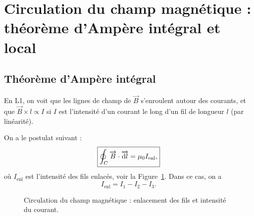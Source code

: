 \section[Circulation du champ magnétique]{Circulation du champ magnétique : théorème d'Ampère intégral et local}

    \subsection{Théorème d'Ampère intégral}

        En L1, on voit que les lignes de champ de $\vec{B}$ s'enroulent autour des courants, et que $\vec{B}\times l\propto I$ si $I$ est l'intensité d'un courant le long d'un fil de longueur $l$ (par linéarité).

        On a le postulat suivant :
        \begin{equation*}
            \boxed{
                \oint_{C}\protect\overrightarrow{{B}}\cdot\protect\overrightarrow{{\mathrm{d} l}}=\mu_0 I_{\text{enl}},
            }
        \end{equation*}
        où $I_{\text{enl}}$ est l'intensité des fils \og enlacés\fg, voir la Figure~\ref{fig:intensite_fil_enlances_circulation_champ_magnetique}. Dans ce cas, on a 
        \begin{equation*}
            I_{\text{enl}}=I_1-I_2-I_3.
        \end{equation*}

        \begin{figure}
            \centering
            \caption{Circulation du champ magnétique : enlacement des fils et intensité du courant.}
            \label{fig:intensite_fil_enlances_circulation_champ_magnetique}
        \end{figure}

